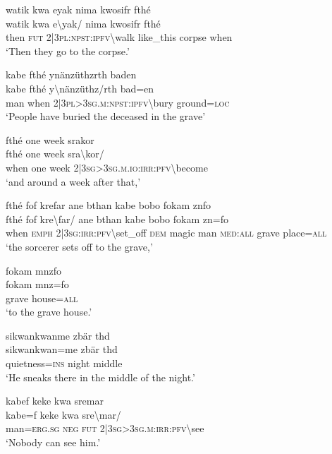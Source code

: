 \ea\label{ex:a4260}
watik kwa eyak nima kwosifr fthé\\
\gll watik	kwa	e{\textbackslash}yak/	nima	kwosifr	fthé\\
     then	\textsc{fut}	2|3\textsc{pl}:\textsc{npst}:\textsc{ipfv}{\textbackslash}walk	like\_this	corpse	when\\
\glt `Then they go to the corpse.'
\z

\ea\label{ex:a4262}
kabe fthé ynänzüthzrth baden\\
\gll kabe	fthé	y{\textbackslash}nänzüthz/rth	bad=en\\
     man	when	2|3\textsc{pl}>3\textsc{sg}.\textsc{m}:\textsc{npst}:\textsc{ipfv}{\textbackslash}bury	ground=\textsc{loc}\\
\glt `People have buried the deceased in the grave'
\z

\ea\label{ex:a4263}
fthé one week srakor\\
\gll fthé	one	week	sra{\textbackslash}kor/\\
     when	one	week	2|3\textsc{sg}>3\textsc{sg}.\textsc{m}.\textsc{io}:\textsc{irr}:\textsc{pfv}{\textbackslash}become\\
\glt `and around a week after that,'
\z

\ea\label{ex:a4264}
fthé fof krefar ane bthan kabe bobo fokam znfo\\
\gll fthé	fof	kre{\textbackslash}far/	ane	bthan	kabe	bobo	fokam	zn=fo\\
     when	\textsc{emph}	2|3\textsc{sg}:\textsc{irr}:\textsc{pfv}{\textbackslash}set\_off	\textsc{dem}	magic	man	\textsc{med}:\textsc{all}	grave	place=\textsc{all}\\
\glt `the sorcerer sets off to the grave,'
\z

\ea\label{ex:a4266}
fokam mnzfo\\
\gll fokam	mnz=fo\\
     grave	house=\textsc{all}\\
\glt `to the grave house.'
\z

\ea\label{ex:a4267}
sikwankwanme zbär thd\\
\gll sikwankwan=me	zbär	thd\\
     quietness=\textsc{ins}	night	middle\\
\glt `He sneaks there in the middle of the night.'
\z

\ea\label{ex:a4268}
kabef keke kwa sremar\\
\gll kabe=f	keke	kwa	sre{\textbackslash}mar/\\
     man=\textsc{erg}.\textsc{sg}	\textsc{neg}	\textsc{fut}	2|3\textsc{sg}>3\textsc{sg}.\textsc{m}:\textsc{irr}:\textsc{pfv}{\textbackslash}see\\
\glt `Nobody can see him.'
\z

